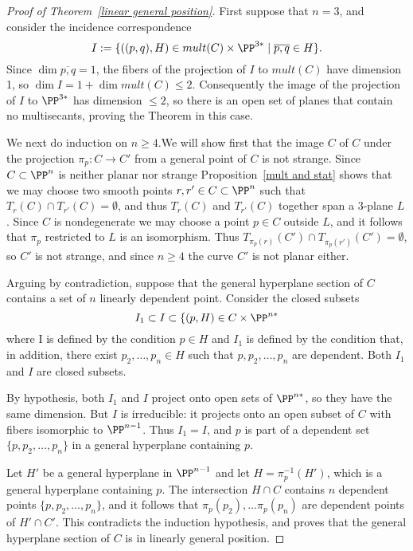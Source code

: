 \begin{proof}[Proof of Theorem~\ref{linear general position}]
First suppose that $n=3$, and consider the incidence correspondence
$$
I := \{ ((p,q), H) \in mult(C) \times \PP^{3*} \mid \overline{p,q}\in H\}.
$$
Since $\dim \overline{p,q} = 1$, the fibers of the projection of $I$ to $mult(C)$ have dimension 1,
so $\dim I = 1+\dim mult(C)  \leq 2$. Consequently the image of  the projection of $I$ to $\PP^{3*}$ has
dimension $\leq 2$, so there is an open set of planes that contain no multisecants, proving the Theorem in this case.

We next do induction on $n\geq 4$.We will show first that the image $C$ of
$C$ under the projection $\pi_p: C\to C'$ from a general point of $C$ is not strange. Since $C\subset \PP^n$ is neither
planar nor strange
Proposition~\ref{mult and stat} shows that we may choose two smooth points
$r,r'\in C\subset \PP^n$ such that $T_r(C)\cap T_{r'}(C) = \emptyset$, and thus 
$T_r(C)$ and $T_{r'}(C)$ together span a 3-plane $L$. Since $C$ is nondegenerate we may
choose a point $p\in C$ outside $L$, and it follows that $\pi_p$ restricted to $L$ is an isomorphism.
Thus $T_{\pi_p(r)}(C') \cap T_{\pi_p({r'})}(C') = \emptyset$, so $C'$ is not strange, 
and since $n\geq 4$ the curve $C'$ is not planar either.

Arguing by contradiction, suppose that the general hyperplane section of $C$ contains a set of $n$ linearly dependent point. Consider the closed subsets  
$$
I_1 \subset I \subset \{(p,H) \in C \times \PP^{n*}
$$
where I is defined by the condition $p\in H$ and $I_1$ is defined by the condition that, in addition, there exist $p_2,\dots, p_n\in H$
such that $p, p_2, \dots, p_n$ are dependent. Both $I_1$ and $I$ are closed subsets.

By hypothesis, both $I_1$ and $I$ project onto open sets of $\PP^{n*}$, so they have the same dimension.
But $I$ is irreducible: it projects onto an open subset of $C$ with fibers isomorphic to $\PP^{n-1}$. Thus $I_1 = I$,
and  $p$ is part of a dependent set
$\{p, p_2,\dots, p_n\}$ in a general hyperplane containing $p$.

Let $H'$ be a general hyperplane in $\PP^{n-1}$
and let $H = \pi_p^{-1}(H')$, which is a general hyperplane containing $p$. The intersection $H\cap C$
contains $n$ dependent points $\{p, p_2,\dots, p_n\}$, and it follows that $\pi_p(p_2),\dots \pi_p(p_n)$
are dependent points of $H'\cap C'$. This contradicts the induction hypothesis, and proves that
the general hyperplane section of $C$ is in linearly general position.
\end{proof}
 
